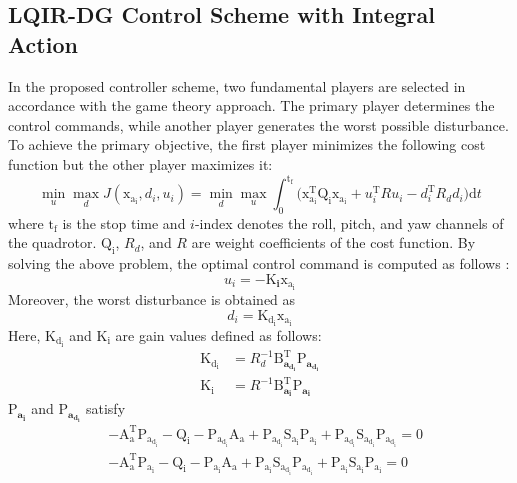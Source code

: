 \documentclass[peerreview]{IEEEtran}
\begin{document}
\subsection{LQIR-DG Control Scheme with Integral Action}
\noindent In the proposed controller scheme, two fundamental players are selected in accordance with the game theory approach. The primary player determines the control commands, while another player generates the worst possible disturbance.
To achieve the primary objective, the first player minimizes the following cost function but the other player maximizes it:
\begin{equation}\label{eq:min_max_cost_function}
    \min_{u} \max_{d} J(\boldsymbol{\mathrm{x_{a_i}}}, {d_i}, {u_i})= \min_{d} \max_{u}
     \int_{0}^{\mathrm{t_f}}\biggl (\boldsymbol{\mathrm{x^\mathrm{T}_{a_i}}}  \boldsymbol{\mathrm{Q_i}} \boldsymbol{\mathrm{x_{a_i}}}+
    {{u^\mathrm{T}_i}}  {{R}} {{u_i}}-
    {{d^\mathrm{T}_{i}}} {{ R_{d} d_{i}}}
    \biggl )\mathrm{d}t
\end{equation}
where $\mathrm{t_f}$ is the stop time and $i$-index denotes the roll, pitch, and yaw channels of the quadrotor. $\boldsymbol{\mathrm{Q_i}}$, ${{R_{d}}}$, and ${{R}}$ are weight coefficients of the cost function.
By solving the above problem, the optimal control command is computed as follows \cite{LQDG}:
\begin{equation}
	{{u_i}} = -\boldsymbol{{\mathrm{K}}_{i}} \boldsymbol{{\mathrm{x_{a_i}}}}
\end{equation}
Moreover, the worst disturbance is obtained as
\begin{equation}
	{{d_i}} =\boldsymbol{{\mathrm{K_{d_i}}}}\boldsymbol{{\mathrm{x_{a_i}}}}
\end{equation}
Here, $\boldsymbol{{\mathrm{K_{d_i}}}}$ and $\boldsymbol{{\mathrm{K_i}}}$ are gain values defined as follows:
\begin{align}
	\boldsymbol{{\mathrm{K_{d_i}}}} &= {{{R}}^{-1}_{d}}\boldsymbol{{\mathrm{B}_{a_{d_i}}^\mathrm{T}}}\boldsymbol{{\mathrm{P}}_{a_{d_i}}}\\
	\boldsymbol{{\mathrm{K_i}}} &= {{{R}}^{-1}}\boldsymbol{{\mathrm{B}_{a_i}^\mathrm{T}}}\boldsymbol{{\mathrm{P}}_{a_i}}
\end{align}
$\boldsymbol{{\mathrm{P}}_{a_i}}$ and $\boldsymbol{{\mathrm{P}}_{a_{d_i}}}$ satisfy
\begin{align}\label{coupled_riccatti_LQIDG}
	&-\boldsymbol{\mathrm{A^\mathrm{T}_a}}\boldsymbol{\mathrm{P_{a_{d_i}}}}
	 - \boldsymbol{\mathrm{Q_{i}}} - \boldsymbol{\mathrm{P_{a_{d_i}}}}\boldsymbol{\mathrm{A_a}} 
	 + \boldsymbol{\mathrm{P_{a_{d_i}}}}\boldsymbol{\mathrm{S_{a_i}}}\boldsymbol{\mathrm{P_{a_i}}}
	  +\boldsymbol{\mathrm{P_{a_{d_i}}}}\boldsymbol{\mathrm{S_{a_{d_i}}}}\boldsymbol{\mathrm{P_{a_{d_i}}}}
	=\boldsymbol{\mathrm{0}}\\
            &-\boldsymbol{\mathrm{A^\mathrm{T}_a}}\boldsymbol{\mathrm{P_{a_i}}} - \boldsymbol{\mathrm{Q_i}}
			 - \boldsymbol{\mathrm{P_{a_i}}}\boldsymbol{\mathrm{A_a}}  +
			  \boldsymbol{\mathrm{P_{a_i}}}\boldsymbol{\mathrm{S_{a_{d_i}}}}\boldsymbol{\mathrm{P_{a_{d_i}}}} 
			  +\boldsymbol{\mathrm{P_{a_i}}}\boldsymbol{\mathrm{S_{a_i}}}\boldsymbol{\mathrm{P_{a_i}}} =\boldsymbol{\mathrm{0}}
\end{align}
\end{document}
